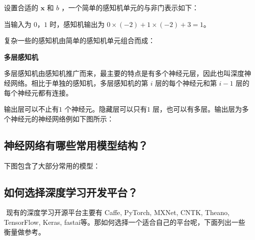 设置合适的 \(\boldsymbol{x}\) 和 \(b\)
，一个简单的感知机单元的与非门表示如下：

%  

当输入为 \(0\)，\(1\) 时，感知机输出为 $ 0 \times (-2) + 1 \times (-2)
+ 3 = 1$。

复杂一些的感知机由简单的感知机单元组合而成：

%  

\textbf{多层感知机}

多层感知机由感知机推广而来，最主要的特点是有多个神经元层，因此也叫深度神经网络。相比于单独的感知机，多层感知机的第
$ i $ 层的每个神经元和第 $ i-1 $ 层的每个神经元都有连接。

%  

输出层可以不止有$ 1$ 个神经元。隐藏层可以只有$ 1$
层，也可以有多层。输出层为多个神经元的神经网络例如下图所示：

%  

\subsection{神经网络有哪些常用模型结构？}\label{ux795eux7ecfux7f51ux7edcux6709ux54eaux4e9bux5e38ux7528ux6a21ux578bux7ed3ux6784}

下图包含了大部分常用的模型：

%  

\subsection{如何选择深度学习开发平台？}\label{ux5982ux4f55ux9009ux62e9ux6df1ux5ea6ux5b66ux4e60ux5f00ux53d1ux5e73ux53f0}

​ 现有的深度学习开源平台主要有 Caffe, PyTorch, MXNet, CNTK, Theano,
TensorFlow, Keras,
fastai等。那如何选择一个适合自己的平台呢，下面列出一些衡量做参考。

